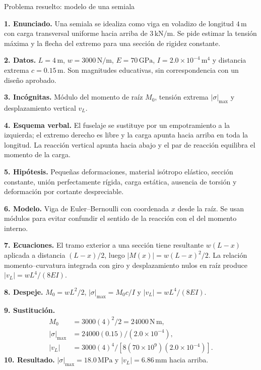 \begin{studiumworked}{Problema resuelto: modelo de una semiala}

\textbf{1. Enunciado.} Una semiala se idealiza como viga en voladizo de longitud $4\,\mathrm{m}$ con carga transversal uniforme hacia arriba de $3\,\mathrm{kN/m}$. Se pide estimar la tensión máxima y la flecha del extremo para una sección de rigidez constante.

\textbf{2. Datos.} $L=4\,\mathrm{m}$, $w=3000\,\mathrm{N/m}$, $E=70\,\mathrm{GPa}$, $I=2.0\times10^{-4}\,\mathrm{m^4}$ y distancia extrema $c=0.15\,\mathrm{m}$. Son magnitudes educativas, sin correspondencia con un diseño aprobado.

\textbf{3. Incógnitas.} Módulo del momento de raíz $M_0$, tensión extrema $|\sigma|_{\max}$ y desplazamiento vertical $v_L$.

\textbf{4. Esquema verbal.} El fuselaje se sustituye por un empotramiento a la izquierda; el extremo derecho es libre y la carga apunta hacia arriba en toda la longitud. La reacción vertical apunta hacia abajo y el par de reacción equilibra el momento de la carga.

\textbf{5. Hipótesis.} Pequeñas deformaciones, material isótropo elástico, sección constante, unión perfectamente rígida, carga estática, ausencia de torsión y deformación por cortante despreciable.

\textbf{6. Modelo.} Viga de Euler--Bernoulli con coordenada $x$ desde la raíz. Se usan módulos para evitar confundir el sentido de la reacción con el del momento interno.

\textbf{7. Ecuaciones.} El tramo exterior a una sección tiene resultante $w(L-x)$ aplicada a distancia $(L-x)/2$, luego $|M(x)|=w(L-x)^2/2$. La relación momento--curvatura integrada con giro y desplazamiento nulos en raíz produce $|v_L|=wL^4/(8EI)$.

\textbf{8. Despeje.} $M_0=wL^2/2$, $|\sigma|_{\max}=M_0c/I$ y $|v_L|=wL^4/(8EI)$.

\textbf{9. Sustitución.}
\begin{align}
 M_0&=3000(4)^2/2=24000\,\mathrm{N\,m},\\
 |\sigma|_{\max}&=24000(0.15)/(2.0\times10^{-4}),\\
 |v_L|&=3000(4)^4/[8(70\times10^9)(2.0\times10^{-4})].
\end{align}
\textbf{10. Resultado.} $|\sigma|_{\max}=18.0\,\mathrm{MPa}$ y $|v_L|=6.86\,\mathrm{mm}$ hacia arriba.


\end{studiumworked}
